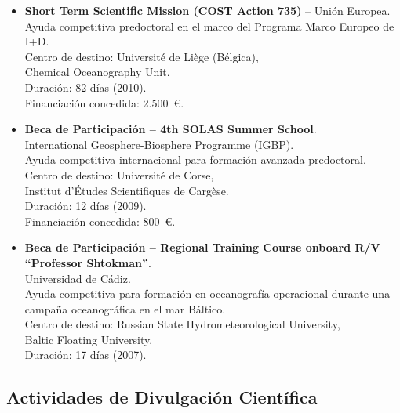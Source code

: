 \documentclass[11pt,a4paper]{article}
\begin{document}
\begin{itemize}[leftmargin=*]
    \item \textbf{Short Term Scientific Mission (COST Action 735)} -- Unión Europea.\\
    Ayuda competitiva predoctoral en el marco del Programa Marco Europeo de I+D.\\
    Centro de destino: Université de Liège (Bélgica),\\
    Chemical Oceanography Unit.\\
    Duración: 82 días (2010).\\
    Financiación concedida: 2.500~€.

    \item \textbf{Beca de Participación -- 4th SOLAS Summer School}.\\
    International Geosphere-Biosphere Programme (IGBP).\\
    Ayuda competitiva internacional para formación avanzada predoctoral.\\
    Centro de destino: Université de Corse,\\
    Institut d’Études Scientifiques de Cargèse.\\
    Duración: 12 días (2009).\\
    Financiación concedida: 800~€.

    \item \textbf{Beca de Participación -- Regional Training Course onboard R/V ``Professor Shtokman''}.\\
    Universidad de Cádiz.\\
    Ayuda competitiva para formación en oceanografía operacional durante una campaña oceanográfica en el mar Báltico.\\
    Centro de destino: Russian State Hydrometeorological University,\\
    Baltic Floating University.\\
    Duración: 17 días (2007).

\end{itemize}
   

\subsection{Actividades de Divulgación Científica}
\end{document}
